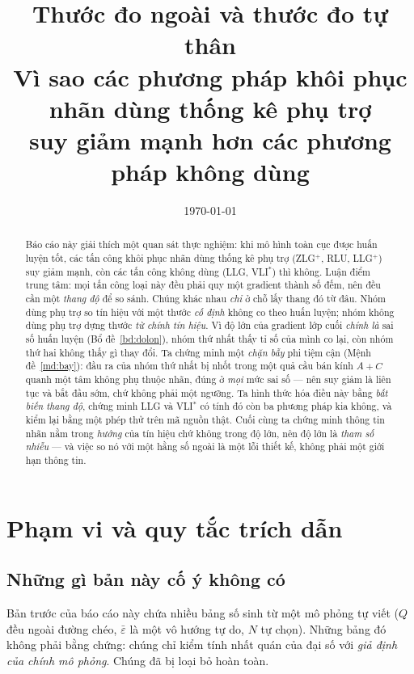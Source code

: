 \documentclass[11pt,a4paper]{article}
\title{Thước đo ngoài và thước đo tự thân\\[0.3em]
\large Vì sao các phương pháp khôi phục nhãn dùng thống kê phụ trợ\\
suy giảm mạnh hơn các phương pháp không dùng}
\author{}
\date{\today}
\theoremstyle{remark}
\begin{document}
\maketitle

\begin{abstract}
Báo cáo này giải thích một quan sát thực nghiệm: khi mô hình toàn cục được
huấn luyện tốt, các tấn công khôi phục nhãn dùng thống kê phụ trợ (ZLG$^+$,
RLU, LLG$^+$) suy giảm mạnh, còn các tấn công không dùng (LLG, VLI$^*$) thì
không. Luận điểm trung tâm: mọi tấn công loại này đều phải quy một gradient
thành số đếm, nên đều cần một \emph{thang độ} để so sánh. Chúng khác nhau
\emph{chỉ} ở chỗ lấy thang đó từ đâu. Nhóm dùng phụ trợ so tín hiệu với một
thước \emph{cố định} không co theo huấn luyện; nhóm không dùng phụ trợ dựng
thước \emph{từ chính tín hiệu}. Vì độ lớn của gradient lớp cuối \emph{chính
là} sai số huấn luyện (Bổ đề~\ref{bd:dolon}), nhóm thứ nhất thấy tỉ số của
mình co lại, còn nhóm thứ hai không thấy gì thay đổi. Ta chứng minh một
\emph{chặn bẫy} phi tiệm cận (Mệnh đề~\ref{md:bay}): đầu ra của nhóm thứ nhất
bị nhốt trong một quả cầu bán kính $A+C$ quanh một tâm không phụ thuộc nhãn,
đúng ở \emph{mọi} mức sai số --- nên suy giảm là liên tục và bắt đầu sớm, chứ
không phải một ngưỡng. Ta hình thức hóa
điều này bằng \emph{bất biến thang độ}, chứng minh LLG và VLI$^*$ có tính đó
còn ba phương pháp kia không, và kiểm lại bằng một phép thử trên mã nguồn
thật. Cuối cùng ta chứng minh thông tin nhãn nằm trong \emph{hướng} của tín
hiệu chứ không trong độ lớn, nên độ lớn là \emph{tham số nhiễu} --- và việc
so nó với một hằng số ngoài là một lỗi thiết kế, không phải một giới hạn
thông tin.
\end{abstract}

\tableofcontents

\section{Phạm vi và quy tắc trích dẫn}

\subsection{Những gì bản này cố ý không có}

Bản trước của báo cáo này chứa nhiều bảng số sinh từ một mô phỏng tự viết
($Q$ đều ngoài đường chéo, $\bar\varepsilon$ là một vô hướng tự do, $N$ tự
chọn). Những bảng đó không phải bằng chứng: chúng chỉ kiểm tính nhất quán của
đại số với \emph{giả định của chính mô phỏng}. Chúng đã bị loại bỏ hoàn toàn.
\end{document}
